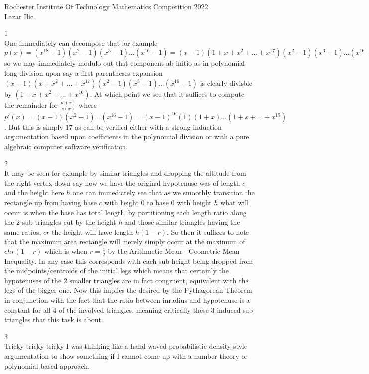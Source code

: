 \Large
Rochester Institute Of Technology Mathematics Competition 2022 \\
Lazar Ilic

1 \\
One immediately can decompose that for example $p(x) = (x^{18}-1)(x^2-1)(x^3-1) \dots (x^{16}-1) = (x-1)(1+x+x^2+\dots+x^{17})(x^2-1)(x^3-1) \dots (x^{16}-1)$ so we may immediately modulo out that component ab initio as in polynomial long division upon say a first parentheses expansion $(x-1)(x+x^2+\dots+x^{17})(x^2-1)(x^3-1) \dots (x^{16}-1)$ is clearly divisble by $(1+x+x^2+\dots+x^{16})$. At which point we see that it suffices to compute the remainder for $\frac{p'(x)}{s(x)}$ where $p'(x) = (x-1)(x^2-1)\dots(x^{16}-1) = (x-1)^{16}(1)(1+x)\dots (1+x+\dots+x^{15})$. But this is simply $\boxed{17}$ as can be verified either with a strong induction argumentation based upon coefficients in the polynomial division or with a pure algebraic computer software verification.

2 \\
It may be seen for example by similar triangles and dropping the altitude from the right vertex down say now we have the original hypotenuse was of length $c$ and the height here $h$ one can immediately see that as we smoothly transition the rectangle up from having base $c$ with height $0$ to base $0$ with height $h$ what will occur is when the base has total length, by partitioning each length ratio along the $2$ sub triangles cut by the height $h$ and those similar triangles having the same ratios, $cr$ the height will have length $h(1-r)$. So then it suffices to note that the maximum area rectangle will merely simply occur at the maximum of $chr(1-r)$ which is when $r = \frac{1}{2}$ by the Arithmetic Mean - Geometric Mean Inequality. In any case this corresponds with each sub height being dropped from the midpoints/centroids of the initial legs which means that certainly the hypotenuses of the $2$ smaller triangles are in fact congruent, equivalent with the legs of the bigger one. Now this implies the desired by the Pythagorean Theorem in conjunction with the fact that the ratio between inradius and hypotenuse is a constant for all $4$ of the involved triangles, meaning critically these $3$ induced sub triangles that this task is about.

3 \\
Tricky tricky tricky I was thinking like a hand waved probabilistic density style argumentation to show something if I cannot come up with a number theory or polynomial based approach.

